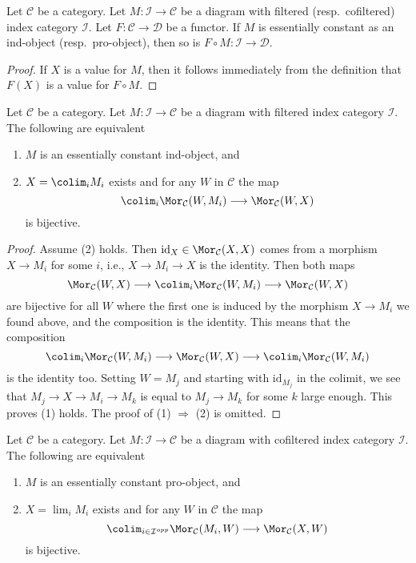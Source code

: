 \begin{lemma}
\label{lemma-image-essentially-constant}
Let $\mathcal{C}$ be a category. Let $M : \mathcal{I} \to \mathcal{C}$
be a diagram with filtered (resp.\ cofiltered) index category $\mathcal{I}$.
Let $F : \mathcal{C} \to \mathcal{D}$ be a functor.
If $M$ is essentially constant as an ind-object (resp.\ pro-object),
then so is $F \circ M : \mathcal{I} \to \mathcal{D}$.
\end{lemma}

\begin{proof}
If $X$ is a value for $M$, then it follows immediately from the
definition that $F(X)$ is a value for $F \circ M$.
\end{proof}

\begin{lemma}
\label{lemma-characterize-essentially-constant-ind}
Let $\mathcal{C}$ be a category. Let $M : \mathcal{I} \to \mathcal{C}$
be a diagram with filtered index category $\mathcal{I}$.
The following are equivalent
\begin{enumerate}
\item $M$ is an essentially constant ind-object, and
\item $X = \colim_i M_i$ exists and for any $W$ in $\mathcal{C}$
the map
$$
\colim_i \Mor_\mathcal{C}(W, M_i) \longrightarrow
\Mor_\mathcal{C}(W, X)
$$
is bijective.
\end{enumerate}
\end{lemma}

\begin{proof}
Assume (2) holds. Then $\text{id}_X \in \Mor_\mathcal{C}(X, X)$
comes from a morphism $X \to M_i$ for some $i$, i.e., $X \to M_i \to X$
is the identity. Then both maps
$$
\Mor_\mathcal{C}(W, X)
\longrightarrow
\colim_i \Mor_\mathcal{C}(W, M_i)
\longrightarrow
\Mor_\mathcal{C}(W, X)
$$
are bijective for all $W$ where the first one is induced by the morphism
$X \to M_i$ we found above, and the composition is the identity. This means
that the composition
$$
\colim_i \Mor_\mathcal{C}(W, M_i)
\longrightarrow
\Mor_\mathcal{C}(W, X)
\longrightarrow
\colim_i \Mor_\mathcal{C}(W, M_i)
$$
is the identity too. Setting $W = M_j$ and starting with $\text{id}_{M_j}$
in the colimit, we see that $M_j \to X \to M_i \to M_k$ is equal to
$M_j \to M_k$ for some $k$ large enough. This proves (1) holds.
The proof of (1) $\Rightarrow$ (2) is omitted.
\end{proof}

\begin{lemma}
\label{lemma-characterize-essentially-constant-pro}
Let $\mathcal{C}$ be a category. Let $M : \mathcal{I} \to \mathcal{C}$
be a diagram with cofiltered index category $\mathcal{I}$.
The following are equivalent
\begin{enumerate}
\item $M$ is an essentially constant pro-object, and
\item $X = \lim_i M_i$ exists and for any $W$ in $\mathcal{C}$
the map
$$
\colim_{i \in \mathcal{I}^{opp}} \Mor_\mathcal{C}(M_i, W)
\longrightarrow
\Mor_\mathcal{C}(X, W)
$$
is bijective.
\end{enumerate}
\end{lemma}

